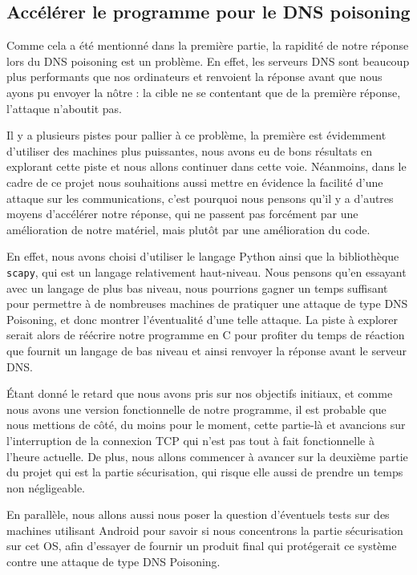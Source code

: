 \documentclass[a4paper, 12pt,twoside]{article}
\begin{document}
        \subsection{Accélérer le programme pour le DNS poisoning}

            Comme cela a été mentionné dans la première partie, la rapidité de notre réponse lors du DNS poisoning est un problème. En effet, les serveurs DNS sont beaucoup plus performants que nos ordinateurs et renvoient la réponse avant que nous ayons pu envoyer la nôtre : la cible ne se contentant que de la première réponse, l'attaque n'aboutit pas.

            Il y a plusieurs pistes pour pallier à ce problème, la première est évidemment d'utiliser des machines plus puissantes, nous avons eu de bons résultats en explorant cette piste et nous allons continuer dans cette voie. Néanmoins, dans le cadre de ce projet nous souhaitions aussi mettre en évidence la facilité d'une attaque sur les communications, c'est pourquoi nous pensons qu'il y a d'autres moyens d'accélérer notre réponse, qui ne passent pas forcément par une amélioration de notre matériel, mais plutôt par une amélioration du code.

            En effet, nous avons choisi d'utiliser le langage Python ainsi que la bibliothèque \verb!scapy!, qui est un langage relativement haut-niveau. Nous pensons qu'en essayant avec un langage de plus bas niveau, nous pourrions gagner un temps suffisant pour permettre à de nombreuses machines de pratiquer une attaque de type DNS Poisoning, et donc montrer l'éventualité d'une telle attaque. La piste à explorer serait alors de réécrire notre programme en C pour profiter du temps de réaction que fournit un langage de bas niveau et ainsi renvoyer la réponse avant le serveur DNS.

            Étant donné le retard que nous avons pris sur nos objectifs initiaux, et comme nous avons une version fonctionnelle de notre programme, il est probable que nous mettions de côté, du moins pour le moment, cette partie-là et avancions sur l'interruption de la connexion TCP qui n'est pas tout à fait fonctionnelle à l'heure actuelle. De plus, nous allons commencer à avancer sur la deuxième partie du projet qui est la partie sécurisation, qui risque elle aussi de prendre un temps non négligeable.

            En parallèle, nous allons aussi nous poser la question d'éventuels tests sur des machines utilisant Android pour savoir si nous concentrons la partie sécurisation sur cet OS, afin d'essayer de fournir un produit final qui protégerait ce système contre une attaque de type DNS Poisoning.
\end{document}

